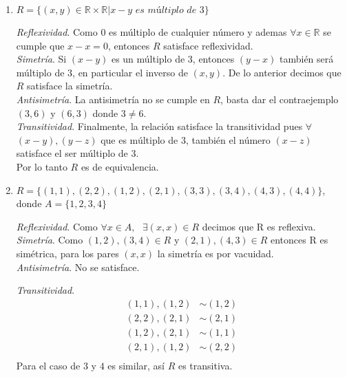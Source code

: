 \documentclass[12pt]{article}
\begin{document}
\begin{enumerate}[label=\alph*)]
    \item $R = \{(x,y) \in \mathbb{R} \times \mathbb{R} | x-y \textit{ es múltiplo de 3}\}$

    \textit{Reflexividad}. Como $0$ es múltiplo de cualquier número y ademas $\forall x \in \mathbb{R}$ se cumple que $x-x = 0$, entonces $R$ satisface reflexividad.\\

    \textit{Simetría}. Si $(x-y)$ es un múltiplo de $3$, entonces $(y-x)$ también será múltiplo de $3$, en particular el inverso de $(x,y)$. De lo
    anterior decimos que $R$ satisface la simetría.\\

    \textit{Antisimetría}. La antisimetría no se cumple en $R$, basta dar el contraejemplo $(3,6)$ y $(6,3)$ donde $3 \neq 6$.\\

    \textit{Transitividad}. Finalmente, la relación satisface la transitividad pues $\forall$ $(x-y), (y-z)$ que es múltiplo de $3$, también el número $(x-z)$ satisface
    el ser múltiplo de 3.\\

    Por lo tanto $R$ es de equivalencia.

    \item $R = \{(1,1),(2,2),(1,2),(2,1),(3,3),(3,4),(4,3),(4,4)\}$, donde $A = \{1,2,3,4\}$

    \textit{Reflexividad}. Como $\forall x \in A, \text{ } \exists (x,x) \in R$ decimos que R es reflexiva.\\ 

    \textit{Simetría}. Como $(1,2), (3,4) \in R$  y $(2,1), (4,3) \in R$ entonces R es simétrica, para los pares $(x,x)$ la simetría es por
    vacuidad.\\

    \textit{Antisimetría}. No se satisface.

    \textit{Transitividad}. 
    \begin{align*}
        (1,1), (1,2)&\sim (1,2)\\
        (2,2), (2,1)&\sim (2,1)\\
        (1,2), (2,1)&\sim (1,1)\\
        (2,1), (1,2)&\sim (2,2)\\
    \end{align*}
    Para el caso de $3$ y $4$ es similar, así $R$ es transitiva.\\
    

\end{enumerate}
\end{document}
